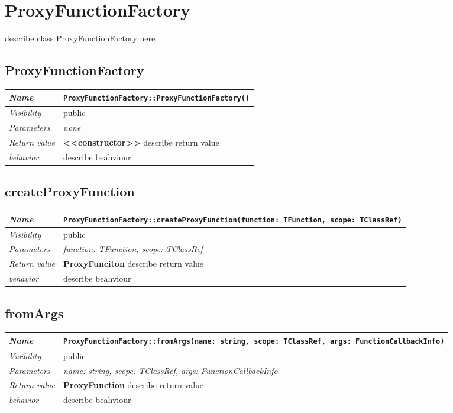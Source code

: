 \chapter{ProxyFunctionFactory}
describe class ProxyFunctionFactory here
\section{ProxyFunctionFactory}
\begin{longtable}{p{3cm} @{\hskip 1cm} p{12cm}}
 \hline
\textit{Name} & \texttt{ProxyFunctionFactory::ProxyFunctionFactory()}\\
\hline
 \textit{Visibility} & public\\
\hline
\textit{Parameters} & \textit{none}\\
\hline
\textit{Return value} & \textbf{ <<constructor>>} describe return value\\
  \hline
 \textit{behavior} & describe beahviour \\
\hline
\end{longtable} \pagebreak
 \section{createProxyFunction}
\begin{longtable}{p{3cm} @{\hskip 1cm} p{12cm}}
 \hline
\textit{Name} & \texttt{ProxyFunctionFactory::createProxyFunction(function: TFunction, scope: TClassRef)}\\
\hline
 \textit{Visibility} & public\\
\hline
\textit{Parameters} & \textit{function: TFunction, scope: TClassRef}\\
\hline
\textit{Return value} & \textbf{ ProxyFunciton} describe return value\\
  \hline
 \textit{behavior} & describe beahviour \\
\hline
\end{longtable} \pagebreak
 \section{fromArgs}
\begin{longtable}{p{3cm} @{\hskip 1cm} p{12cm}}
 \hline
\textit{Name} & \texttt{ProxyFunctionFactory::fromArgs(name: string, scope: TClassRef, args: FunctionCallbackInfo)}\\
\hline
 \textit{Visibility} & public\\
\hline
\textit{Parameters} & \textit{name: string, scope: TClassRef, args: FunctionCallbackInfo}\\
\hline
\textit{Return value} & \textbf{ ProxyFunction} describe return value\\
  \hline
 \textit{behavior} & describe beahviour \\
\hline
\end{longtable} \pagebreak
 